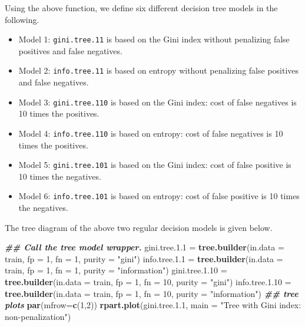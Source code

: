 \documentclass[
]{book}
\newenvironment{Shaded}{\begin{snugshade}}{\end{snugshade}}
\newcommand{\AttributeTok}[1]{\textcolor[rgb]{0.13,0.29,0.53}{#1}}
\newcommand{\DecValTok}[1]{\textcolor[rgb]{0.00,0.00,0.81}{#1}}
\newcommand{\DocumentationTok}[1]{\textcolor[rgb]{0.56,0.35,0.01}{\textbf{\textit{#1}}}}
\newcommand{\FloatTok}[1]{\textcolor[rgb]{0.00,0.00,0.81}{#1}}
\newcommand{\FunctionTok}[1]{\textcolor[rgb]{0.13,0.29,0.53}{\textbf{#1}}}
\newcommand{\NormalTok}[1]{#1}
\newcommand{\OtherTok}[1]{\textcolor[rgb]{0.56,0.35,0.01}{#1}}
\newcommand{\StringTok}[1]{\textcolor[rgb]{0.31,0.60,0.02}{#1}}
\begin{document}
Using the above function, we define six different decision tree models in the following.

\begin{itemize}
\item
  Model 1: \texttt{gini.tree.11} is based on the Gini index without penalizing false positives and false negatives.
\item
  Model 2: \texttt{info.tree.11} is based on entropy without penalizing false positives and false negatives.
\item
  Model 3: \texttt{gini.tree.110} is based on the Gini index: cost of false negatives is 10 times the positives.
\item
  Model 4: \texttt{info.tree.110} is based on entropy: cost of false negatives is 10 times the positives.
\item
  Model 5: \texttt{gini.tree.101} is based on the Gini index: cost of false positive is 10 times the negatives.
\item
  Model 6: \texttt{info.tree.101} is based on entropy: cost of false positive is 10 times the negatives.
\end{itemize}

The tree diagram of the above two regular decision models is given below.

\begin{Shaded}
\begin{Highlighting}[]
\DocumentationTok{\#\# Call the tree model wrapper.}
\NormalTok{gini.tree.}\FloatTok{1.1} \OtherTok{=} \FunctionTok{tree.builder}\NormalTok{(}\AttributeTok{in.data =}\NormalTok{ train, }\AttributeTok{fp =} \DecValTok{1}\NormalTok{, }\AttributeTok{fn =} \DecValTok{1}\NormalTok{, }\AttributeTok{purity =} \StringTok{"gini"}\NormalTok{)}
\NormalTok{info.tree.}\FloatTok{1.1} \OtherTok{=} \FunctionTok{tree.builder}\NormalTok{(}\AttributeTok{in.data =}\NormalTok{ train, }\AttributeTok{fp =} \DecValTok{1}\NormalTok{, }\AttributeTok{fn =} \DecValTok{1}\NormalTok{, }\AttributeTok{purity =} \StringTok{"information"}\NormalTok{)}
\NormalTok{gini.tree.}\FloatTok{1.10} \OtherTok{=} \FunctionTok{tree.builder}\NormalTok{(}\AttributeTok{in.data =}\NormalTok{ train, }\AttributeTok{fp =} \DecValTok{1}\NormalTok{, }\AttributeTok{fn =} \DecValTok{10}\NormalTok{, }\AttributeTok{purity =} \StringTok{"gini"}\NormalTok{)}
\NormalTok{info.tree.}\FloatTok{1.10} \OtherTok{=} \FunctionTok{tree.builder}\NormalTok{(}\AttributeTok{in.data =}\NormalTok{ train, }\AttributeTok{fp =} \DecValTok{1}\NormalTok{, }\AttributeTok{fn =} \DecValTok{10}\NormalTok{, }\AttributeTok{purity =} \StringTok{"information"}\NormalTok{)}
\DocumentationTok{\#\# tree plots}
\FunctionTok{par}\NormalTok{(}\AttributeTok{mfrow=}\FunctionTok{c}\NormalTok{(}\DecValTok{1}\NormalTok{,}\DecValTok{2}\NormalTok{))}
\FunctionTok{rpart.plot}\NormalTok{(gini.tree.}\FloatTok{1.1}\NormalTok{, }\AttributeTok{main =} \StringTok{"Tree with Gini index: non{-}penalization"}\NormalTok{)}
\end{Highlighting}
\end{Shaded}
\end{document}
